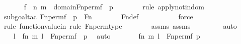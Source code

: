 \begin{isabellebody}
\ \ \ \ \isamarkupfalse%
\ {\isachardoublequoteopen}{\isasymlangle}f\ {\isacharbackquote}{\kern0pt}\ n{\isacharcomma}{\kern0pt}\ m{\isasymrangle}\ {\isasymin}\ domain{\isacharparenleft}{\kern0pt}Fn{\isacharunderscore}{\kern0pt}perm{\isacharprime}{\kern0pt}{\isacharparenleft}{\kern0pt}f{\isacharparenright}{\kern0pt}\ {\isacharbackquote}{\kern0pt}\ p{\isacharparenright}{\kern0pt}{\isachardoublequoteclose}\ \isanewline
\ \ \ \ \ \ \isamarkupfalse%
{\isacharparenleft}{\kern0pt}rule\ apply{\isacharunderscore}{\kern0pt}not{}{\isacharunderscore}{\kern0pt}indom{\isacharparenright}{\kern0pt}\isanewline
\ \ \ \ \ \ \ \isamarkupfalse%
{\isacharparenleft}{\kern0pt}subgoal{\isacharunderscore}{\kern0pt}tac\ {\isachardoublequoteopen}Fn{\isacharunderscore}{\kern0pt}perm{\isacharprime}{\kern0pt}{\isacharparenleft}{\kern0pt}f{\isacharparenright}{\kern0pt}\ {\isacharbackquote}{\kern0pt}\ p\ {\isasymin}\ Fn{\isachardoublequoteclose}{\isacharparenright}{\kern0pt}\isanewline
\ \ \ \ \ \ \isamarkupfalse%
\ Fn{\isacharunderscore}{\kern0pt}def\ \isanewline
\ \ \ \ \ \ \ \ \isamarkupfalse%
\ force\isanewline
\ \ \ \ \ \ \isamarkupfalse%
{\isacharparenleft}{\kern0pt}rule\ function{\isacharunderscore}{\kern0pt}value{\isacharunderscore}{\kern0pt}in{\isacharcomma}{\kern0pt}\ rule\ Fn{\isacharunderscore}{\kern0pt}perm{\isacharprime}{\kern0pt}{\isacharunderscore}{\kern0pt}type{\isacharparenright}{\kern0pt}\isanewline
\ \ \ \ \ \ \isamarkupfalse%
\ assms\ assms{}\ \isanewline
\ \ \ \ \ \ \isamarkupfalse%
\ auto\isanewline
\ \ \ \ \isamarkupfalse%
\ \isamarkupfalse%
\ l\ \ {\isachardoublequoteopen}{\isacharless}{\kern0pt}{\isacharless}{\kern0pt}f{\isacharbackquote}{\kern0pt}n{\isacharcomma}{\kern0pt}\ m{\isachargreater}{\kern0pt}{\isacharcomma}{\kern0pt}\ l{\isachargreater}{\kern0pt}\ {\isasymin}\ Fn{\isacharunderscore}{\kern0pt}perm{\isacharprime}{\kern0pt}{\isacharparenleft}{\kern0pt}f{\isacharparenright}{\kern0pt}\ {\isacharbackquote}{\kern0pt}\ p{\isachardoublequoteclose}\ \isamarkupfalse%
\ auto\isanewline
\ \ \ \ \isamarkupfalse%
\ \isamarkupfalse%
\ {\isachardoublequoteopen}{\isacharless}{\kern0pt}{\isacharless}{\kern0pt}f{\isacharbackquote}{\kern0pt}n{\isacharcomma}{\kern0pt}\ m{\isachargreater}{\kern0pt}{\isacharcomma}{\kern0pt}\ l{\isachargreater}{\kern0pt}\ {\isasymin}\ Fn{\isacharunderscore}{\kern0pt}perm{\isacharparenleft}{\kern0pt}f{\isacharcomma}{\kern0pt}\ p{\isacharparenright}{\kern0pt}{\isachardoublequoteclose}\ \isanewline

\end{isabellebody}
